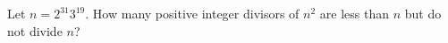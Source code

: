 Let $n=2^{31}3^{19}.$  How many positive integer divisors of $n^2$ are less than $n$ but do not divide $n$?